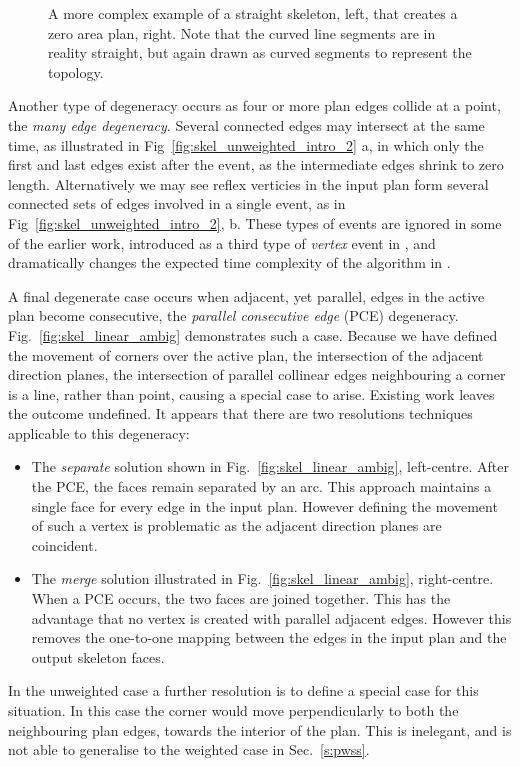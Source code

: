 \begin{figure}
  \centering
  \def\svgwidth{1.0\columnwidth}
  
  \caption[An example of the loop of two situation]{\label{fig:skel_loop_two} A more complex example of a straight skeleton, left, that creates a zero area plan, right. Note that the curved line segments are in reality straight, but again drawn as curved segments to represent the topology.}
\end{figure}

Another type of degeneracy occurs as four or more plan edges collide at a point, the \emph{many edge degeneracy}. Several connected edges may intersect at the same time, as illustrated in Fig~\ref{fig:skel_unweighted_intro_2} a, in which only the first and last edges exist after the event, as the intermediate edges shrink to zero length. 
Alternatively we may see reflex verticies in the input plan form several connected sets of edges involved in a single event, as in Fig~\ref{fig:skel_unweighted_intro_2}, b.  These types of events are ignored in some of the earlier work\cite{Aichholzer95}, introduced as a third type of \emph{vertex} event in \cite{Epp:98}, and dramatically changes the expected time complexity of the algorithm in \cite{Cheng02}.

A final degenerate case occurs when adjacent, yet parallel, edges in the active plan become consecutive, the \emph{parallel consecutive edge} (PCE) degeneracy.
Fig.~\ref{fig:skel_linear_ambig} demonstrates such a case. Because we have defined the movement of corners over the active plan, the intersection of the adjacent direction planes, the intersection of parallel collinear edges neighbouring a corner is a line, rather than point, causing a special case to arise. Existing work\cite{Aichholzer95} leaves the outcome undefined. It appears that there are two resolutions techniques applicable to this degeneracy:
\begin{itemize}
\item The \emph{separate} solution shown in Fig.~\ref{fig:skel_linear_ambig}, left-centre.  After the PCE, the faces remain separated by an arc. This approach maintains a single face for every edge in the input plan. However defining the movement of such a vertex is problematic as the adjacent direction planes are coincident. 
\item The \emph{merge} solution illustrated in Fig.~\ref{fig:skel_linear_ambig}, right-centre. When a PCE occurs, the two faces are joined together. This has the advantage that no vertex is created with parallel adjacent edges. However this removes the one-to-one mapping between the edges in the input plan and the output skeleton faces.
\end{itemize}
In the unweighted case a further resolution is to define a special case for this situation. In this case the corner would move perpendicularly to both the neighbouring plan edges, towards the interior of the plan. This is inelegant, and is not able to generalise to the weighted case in Sec.~\ref{s:pwss}.


